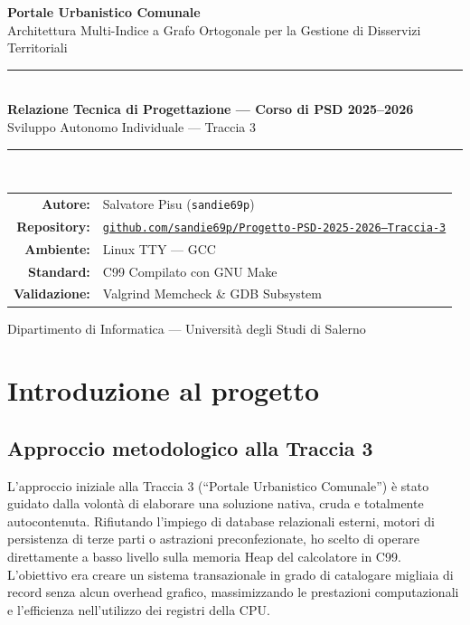 \documentclass[12pt, a4paper]{article}
\begin{document}
\begin{titlepage}
    \centering
    \vspace*{1.5cm}
    {\Huge\bfseries\color{primary} Portale Urbanistico Comunale} \\[0.5cm]
    {\Large\color{accent} Architettura Multi-Indice a Grafo Ortogonale per la Gestione di Disservizi Territoriali} \\
    \vspace{1.5cm}
    \noindent\rule{\linewidth}{1.5pt} \\
    \vspace{0.3cm}
    {\large\bfseries Relazione Tecnica di Progettazione --- Corso di PSD 2025--2026} \\
    {\large Sviluppo Autonomo Individuale --- Traccia 3} \\
    \vspace{0.3cm}
    \noindent\rule{\linewidth}{0.5pt} \\
    \vspace{2cm}
    \begin{tabular}{rl}
        \textbf{Autore:}       & Salvatore Pisu (\texttt{sandie69p}) \\[4pt]
        \textbf{Repository:}   & \href{https://github.com/sandie69p/Progetto-PSD-2025-2026---Traccia-3}{\texttt{github.com/sandie69p/Progetto-PSD-2025-2026---Traccia-3}} \\[4pt]
        \textbf{Ambiente:}     & Linux TTY --- GCC \\[4pt]
        \textbf{Standard:}     & C99 Compilato con GNU Make \\[4pt]
        \textbf{Validazione:}  & Valgrind Memcheck \& GDB Subsystem \\
    \end{tabular}
    \vfill
    {\small\color{gray} Dipartimento di Informatica --- Università degli Studi di Salerno}
\end{titlepage}

\tableofcontents
\newpage

\section{Introduzione al progetto}

\subsection{Approccio metodologico alla Traccia 3}
L'approccio iniziale alla Traccia 3 (``Portale Urbanistico Comunale'') è stato guidato dalla volontà di elaborare una soluzione nativa, cruda e totalmente autocontenuta. Rifiutando l'impiego di database relazionali esterni, motori di persistenza di terze parti o astrazioni preconfezionate, ho scelto di operare direttamente a basso livello sulla memoria Heap del calcolatore in C99. L'obiettivo era creare un sistema transazionale in grado di catalogare migliaia di record senza alcun overhead grafico, massimizzando le prestazioni computazionali e l'efficienza nell'utilizzo dei registri della CPU.
\end{document}
